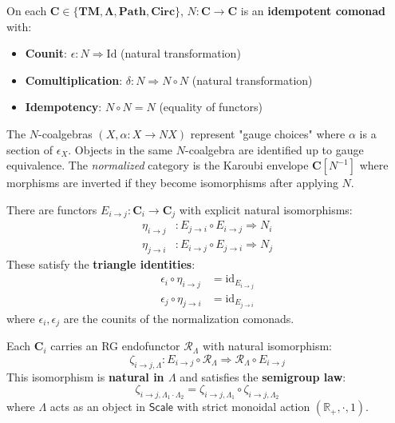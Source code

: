 \begin{definition}[Normalization]
\label{def:normalization}
On each $\mathbf{C}\in\{\mathbf{TM},\mathbf{\Lambda},\mathbf{Path},\mathbf{Circ}\}$,
$N:\mathbf{C}\to\mathbf{C}$ is an \textbf{idempotent comonad} with:
\begin{itemize}
\item \textbf{Counit}: $\epsilon:N\Rightarrow \mathrm{Id}$ (natural transformation)
\item \textbf{Comultiplication}: $\delta:N\Rightarrow N\circ N$ (natural transformation)
\item \textbf{Idempotency}: $N\circ N = N$ (equality of functors)
\end{itemize}
The $N$-coalgebras $(X,\alpha:X\to NX)$ represent "gauge choices" where $\alpha$ is a section of $\epsilon_X$. Objects in the same $N$-coalgebra are identified up to gauge equivalence. The \emph{normalized} category is the Karoubi envelope $\mathbf{C}[N^{-1}]$ where morphisms are inverted if they become isomorphisms after applying $N$.
\end{definition}

\begin{axiom}
\label{ax:encdec}
There are functors $E_{i\to j}:\mathbf{C}_i\to\mathbf{C}_j$ with explicit natural isomorphisms:
\begin{align}
\eta_{i\to j} &: E_{j\to i}\circ E_{i\to j} \Rightarrow N_i \\
\eta_{j\to i} &: E_{i\to j}\circ E_{j\to i} \Rightarrow N_j
\end{align}
These satisfy the \textbf{triangle identities}:
\begin{align}
\epsilon_i \circ \eta_{i\to j} &= \mathrm{id}_{E_{i\to j}} \\
\epsilon_j \circ \eta_{j\to i} &= \mathrm{id}_{E_{j\to i}}
\end{align}
where $\epsilon_i, \epsilon_j$ are the counits of the normalization comonads.
\end{axiom}

\begin{axiom}[RG-compatibility]
\label{ax:rg}
Each $\mathbf{C}_i$ carries an RG endofunctor $\mathcal{R}_\Lambda$ with natural isomorphism:
\[
\zeta_{i\to j,\Lambda} : E_{i\to j}\circ \mathcal{R}_\Lambda \Rightarrow \mathcal{R}_\Lambda \circ E_{i\to j}
\]
This isomorphism is \textbf{natural in $\Lambda$} and satisfies the \textbf{semigroup law}:
\[
\zeta_{i\to j,\Lambda_1 \cdot \Lambda_2} = \zeta_{i\to j,\Lambda_1} \circ \zeta_{i\to j,\Lambda_2}
\]
where $\Lambda$ acts as an object in $\mathsf{Scale}$ with strict monoidal action $(\mathbb{R}_+, \cdot, 1)$.
\end{axiom}

